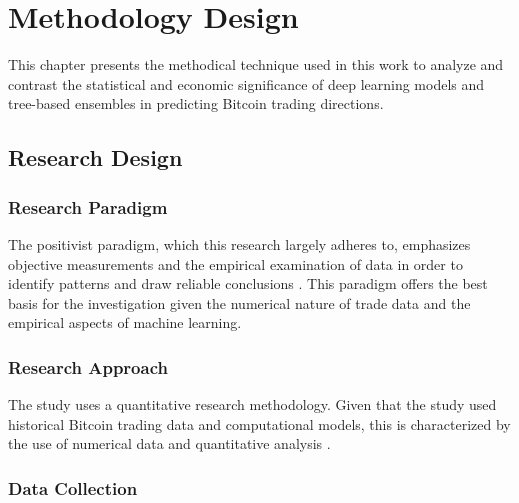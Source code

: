 \def\baselinestretch{1}

\chapter{Methodology Design}

\def\baselinestretch{1.44}


This chapter presents the methodical technique used in this work to analyze and contrast the statistical and economic significance of deep learning models and tree-based ensembles in predicting Bitcoin trading directions. 
   
\smallskip

\goodbreak
\section{Research Design}
\goodbreak

\subsection{Research Paradigm }

The positivist paradigm, which this research largely adheres to, emphasizes objective measurements and the empirical examination of data in order to identify patterns and draw reliable conclusions \citep{alma9924678548402466}. This paradigm offers the best basis for the investigation given the numerical nature of trade data and the empirical aspects of machine learning.

\subsection{Research Approach}

The study uses a quantitative research methodology. Given that the study used historical Bitcoin trading data and computational models, this is characterized by the use of numerical data and quantitative analysis \citep{creswell2014research}.

\subsection{Data Collection}

